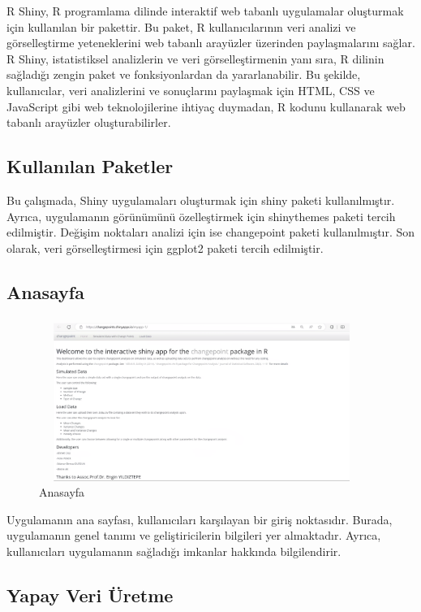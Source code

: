 \documentclass[12pt,twoside]{deuthesis}
\begin{document}
R Shiny, R programlama dilinde interaktif web tabanlı uygulamalar oluşturmak için kullanılan bir pakettir. Bu paket, R kullanıcılarının veri analizi ve görselleştirme yeteneklerini web tabanlı arayüzler üzerinden paylaşmalarını sağlar. R Shiny, istatistiksel analizlerin ve veri görselleştirmenin yanı sıra, R dilinin sağladığı zengin paket ve fonksiyonlardan da yararlanabilir. Bu şekilde, kullanıcılar, veri analizlerini ve sonuçlarını paylaşmak için HTML, CSS ve JavaScript gibi web teknolojilerine ihtiyaç duymadan, R kodunu kullanarak web tabanlı arayüzler oluşturabilirler.

\subsection{Kullanılan Paketler}\label{kullanux131lan-paketler}

Bu çalışmada, Shiny uygulamaları oluşturmak için shiny paketi kullanılmıştır. Ayrıca, uygulamanın görünümünü özelleştirmek için shinythemes paketi tercih edilmiştir. Değişim noktaları analizi için ise changepoint paketi kullanılmıştır. Son olarak, veri görselleştirmesi için ggplot2 paketi tercih edilmiştir.

\subsection{Anasayfa}\label{anasayfa}

\begin{figure}
\includegraphics[width=400px,height=200px]{figure/anasayfa} \caption{Anasayfa}\label{fig:unnamed-chunk-12}
\end{figure}

Uygulamanın ana sayfası, kullanıcıları karşılayan bir giriş noktasıdır. Burada, uygulamanın genel tanımı ve geliştiricilerin bilgileri yer almaktadır. Ayrıca, kullanıcıları uygulamanın sağladığı imkanlar hakkında bilgilendirir.

\subsection{Yapay Veri Üretme}\label{yapay-veri-uxfcretme}
\end{document}
